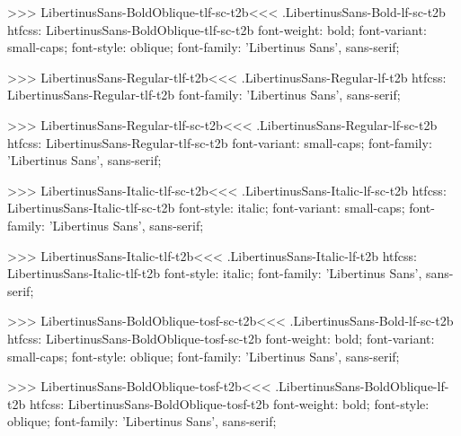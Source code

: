 {{{{{>>>
\<LibertinusSans-BoldOblique-tlf-sc-t2b\><<<
.LibertinusSans-Bold-lf-sc-t2b
htfcss:  LibertinusSans-BoldOblique-tlf-sc-t2b  font-weight: bold; font-variant: small-caps; font-style: oblique; font-family: 'Libertinus Sans', sans-serif;

>>>
\<LibertinusSans-Regular-tlf-t2b\><<<
.LibertinusSans-Regular-lf-t2b
htfcss:  LibertinusSans-Regular-tlf-t2b  font-family: 'Libertinus Sans', sans-serif;

>>>
\<LibertinusSans-Regular-tlf-sc-t2b\><<<
.LibertinusSans-Regular-lf-sc-t2b
htfcss:  LibertinusSans-Regular-tlf-sc-t2b  font-variant: small-caps; font-family: 'Libertinus Sans', sans-serif;

>>>
\<LibertinusSans-Italic-tlf-sc-t2b\><<<
.LibertinusSans-Italic-lf-sc-t2b
htfcss:  LibertinusSans-Italic-tlf-sc-t2b  font-style: italic; font-variant: small-caps; font-family: 'Libertinus Sans', sans-serif;

>>>
\<LibertinusSans-Italic-tlf-t2b\><<<
.LibertinusSans-Italic-lf-t2b
htfcss:  LibertinusSans-Italic-tlf-t2b  font-style: italic; font-family: 'Libertinus Sans', sans-serif;

>>>
\<LibertinusSans-BoldOblique-tosf-sc-t2b\><<<
.LibertinusSans-Bold-lf-sc-t2b
htfcss:  LibertinusSans-BoldOblique-tosf-sc-t2b  font-weight: bold; font-variant: small-caps; font-style: oblique; font-family: 'Libertinus Sans', sans-serif;

>>>
\<LibertinusSans-BoldOblique-tosf-t2b\><<<
.LibertinusSans-BoldOblique-lf-t2b
htfcss:  LibertinusSans-BoldOblique-tosf-t2b  font-weight: bold; font-style: oblique; font-family: 'Libertinus Sans', sans-serif;

}}}}}
